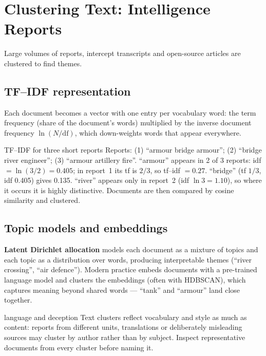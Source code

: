 \documentclass[11pt]{article}
\begin{document}
\section{Clustering Text: Intelligence Reports}
Large volumes of reports, intercept transcripts and open-source articles are clustered to find themes.
\subsection{TF--IDF representation}
Each document becomes a vector with one entry per vocabulary word: the term frequency (share of the document's words) multiplied by the inverse document frequency $\ln(N/\text{df})$, which down-weights words that appear everywhere.
\begin{example}{TF--IDF for three short reports}
Reports: (1) ``armour bridge armour''; (2) ``bridge river engineer''; (3) ``armour artillery fire''. ``armour'' appears in 2 of 3 reports: idf $=\ln(3/2)=0.405$; in report~1 its tf is $2/3$, so tf--idf $=0.27$. ``bridge'' (tf $1/3$, idf 0.405) gives 0.135. ``river'' appears only in report~2 (idf $\ln3=1.10$), so where it occurs it is highly distinctive. Documents are then compared by cosine similarity and clustered.
\end{example}
\subsection{Topic models and embeddings}
\textbf{Latent Dirichlet allocation} models each document as a mixture of topics and each topic as a distribution over words, producing interpretable themes (``river crossing'', ``air defence''). Modern practice embeds documents with a pre-trained language model and clusters the embeddings (often with HDBSCAN), which captures meaning beyond shared words --- ``tank'' and ``armour'' land close together.
\begin{pitfall}{language and deception}
Text clusters reflect vocabulary and style as much as content: reports from different units, translations or deliberately misleading sources may cluster by author rather than by subject. Inspect representative documents from every cluster before naming it.
\end{pitfall}
\end{document}
